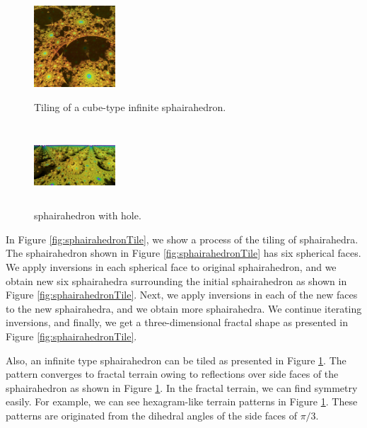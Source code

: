\documentclass[dvipdfmx]{interact}
\theoremstyle{plain}%
\theoremstyle{definition}
\theoremstyle{remark}
\theoremstyle{problemstyle}
\begin{document}
\begin{figure}[h!tbp]
\begin{minipage}[t]{0.19\textwidth}
  \label{fig:terrainStep10}
 \end{minipage}
 \hspace*{\fill}
 \begin{minipage}[t]{0.19\textwidth}
  \centering
  \includegraphics[height=1.2in, keepaspectratio]{./img/constructFractal/terrainProcess/final.jpg}
  \label{fig:sphairaPrismFinal}
 \end{minipage}
 \caption{Tiling of a cube-type infinite sphairahedron.}
 \label{fig:sphairahedralPrismTile}
\end{figure}

\begin{figure}[h!tbp]
  \centering
 \includegraphics[width=1.2in, height=1.2in,
 keepaspectratio]{./img/constructFractal/semi-terrain2.png}
 \caption{sphairahedron with hole.}
  \label{fig:semiSphairaSpheres}
\end{figure}

In Figure \ref{fig:sphairahedronTile}, we show a process of the tiling of
sphairahedra.
The sphairahedron shown in Figure
\ref{fig:sphairahedronTile} has six spherical
faces.
We apply inversions in each spherical face to original sphairahedron,
and we obtain new six sphairahedra surrounding the initial sphairahedron
as shown in Figure
\ref{fig:sphairahedronTile}.
Next, we apply inversions in each of the new faces to the new sphairahedra,
and we obtain more sphairahedra.
We continue iterating inversions, and finally, we get a three-dimensional
fractal shape as presented in Figure
\ref{fig:sphairahedronTile}.

Also, an infinite type sphairahedron can be tiled as presented in Figure
\ref{fig:sphairahedralPrismTile}.
The pattern converges to fractal terrain owing to reflections over side
faces of the sphairahedron as shown in Figure 
\ref{fig:sphairahedralPrismTile}.
In the fractal terrain, we can find symmetry easily.
For example, we can see hexagram-like terrain patterns in Figure
\ref{fig:sphairahedralPrismTile}.
These patterns are originated from the dihedral angles of the side faces of
$\pi / 3$.
\end{document}
